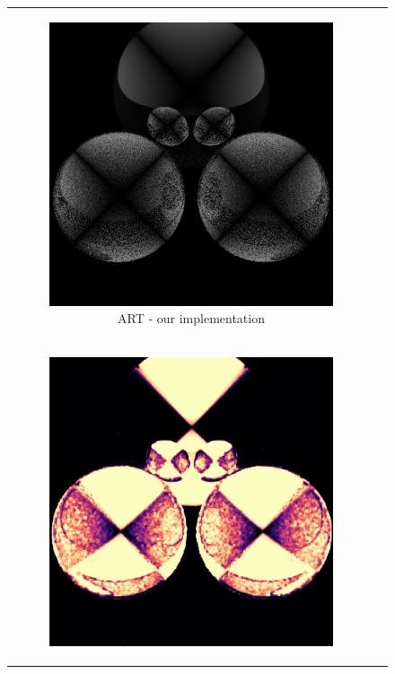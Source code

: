 \begin{figure}[h]
\begin{tabular}{cc}
\begin{subfigure}
			{0.4\textwidth}\centering\includegraphics[width=\linewidth]{img/polarizing_spheres.s1_ART.png}
			\caption{ART - our implementation}
		\end{subfigure} \\
		\begin{subfigure}
			{0.4\textwidth}\centering\includegraphics[width=\linewidth]{img/polarizing_spheres.s1_SSIM.png}

\end{subfigure}
\end{tabular}
\end{figure}
